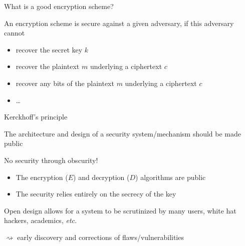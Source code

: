 \documentclass[aspectratio=169, lualatex, handout, 10pt,dvipsnames,svgnames]{beamer} %
\def\enrouge#1{\textcolor{rouge}{#1}}
\begin{document}
\begin{frame}{What is a good encryption scheme?}

  An encryption scheme is secure against a given adversary, if this adversary cannot
  
  \begin{itemize}
  \pause
  \item recover the secret key $k$
  \pause
  \item recover the plaintext $m$ underlying a ciphertext $c$
  \pause
  \item recover any bits of the plaintext $m$ underlying a ciphertext $c$
  \item \dots    
  \end{itemize}
\end{frame}

\begin{frame}{Kerckhoff's principle}

  The architecture and design of a security system/mechanism should be made public
  \bigskip
  
  \begin{alertblock}{No security through obscurity!}
    \begin{itemize}
    \item The encryption ($E$) and decryption ($D$) algorithms are public
    \item The security relies entirely on the secrecy of the key
    \end{itemize}
  \end{alertblock}
  \bigskip

  Open design allows for a system to be scrutinized by many users, white hat hackers, academics, \emph{etc.}

  \enrouge{$\rightsquigarrow$} early discovery and corrections of flaws/vulnerabilities  
\end{frame}
\end{document}
